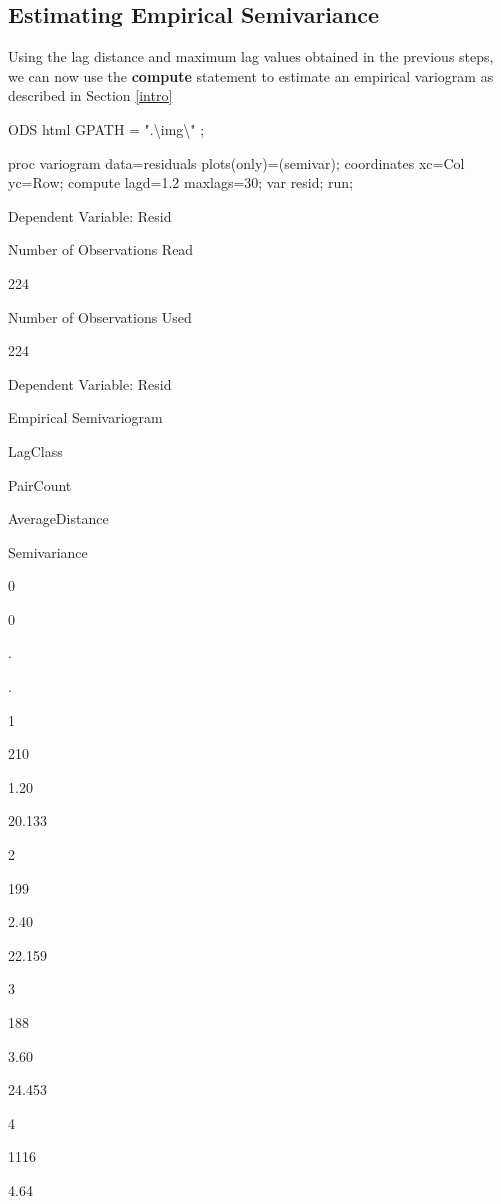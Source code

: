 \documentclass[
]{book}
\newenvironment{Shaded}{\begin{snugshade}}{\end{snugshade}}
\newcommand{\NormalTok}[1]{#1}
\begin{document}
\hypertarget{estimating-empirical-semivariance}{%
\subsection{Estimating Empirical Semivariance}\label{estimating-empirical-semivariance}}

Using the lag distance and maximum lag values obtained in the previous steps, we can now use the \textbf{compute} statement to estimate an empirical variogram as described in Section \ref{intro}

\begin{Shaded}
\begin{Highlighting}[]
\NormalTok{ODS html GPATH = ".\textbackslash{}img\textbackslash{}" ;}

\NormalTok{proc variogram data=residuals plots(only)=(semivar);}
\NormalTok{   coordinates xc=Col yc=Row;}
\NormalTok{   compute lagd=1.2 maxlags=30;}
\NormalTok{  var resid;}
\NormalTok{run;}
\end{Highlighting}
\end{Shaded}

Dependent Variable: Resid

Number of Observations Read

224

Number of Observations Used

224

Dependent Variable: Resid

Empirical Semivariogram

LagClass

PairCount

AverageDistance

Semivariance

0

0

.

.

1

210

1.20

20.133

2

199

2.40

22.159

3

188

3.60

24.453

4

1116

4.64
\end{document}
